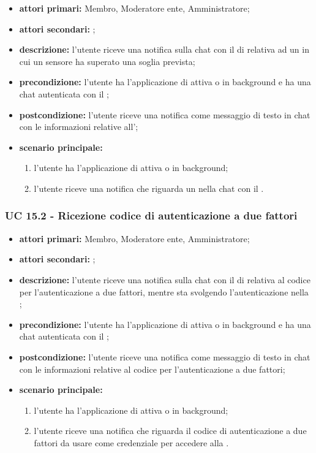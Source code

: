 	\begin{itemize}
		\item \textbf{attori primari:} Membro, Moderatore ente, Amministratore;
		\item \textbf{attori secondari:} ;
		\item \textbf{descrizione:} l'utente riceve una notifica sulla chat con il  di  relativa ad un  in cui un sensore ha superato una soglia prevista;
		\item \textbf{precondizione:} l'utente ha l'applicazione di  attiva o in background e ha una chat autenticata con il ;
		\item \textbf{postcondizione:} l'utente riceve una notifica come messaggio di testo in chat con le informazioni relative all';
		\item \textbf{scenario principale:}
		\begin{enumerate}
			\item l'utente ha l'applicazione di  attiva o in background;
			\item l'utente riceve una notifica che riguarda un  nella chat con il .
		\end{enumerate}
	\end{itemize}

	\subsubsection{UC 15.2 - Ricezione codice di autenticazione a due fattori}

	\begin{itemize}
		\item \textbf{attori primari:} Membro, Moderatore ente, Amministratore;
		\item \textbf{attori secondari:} ;
		\item \textbf{descrizione:} l'utente riceve una notifica sulla chat con il  di  relativa al codice per l'autenticazione a due fattori, mentre sta svolgendo l'autenticazione nella ;
		\item \textbf{precondizione:} l'utente ha l'applicazione di  attiva o in background e ha una chat autenticata con il ;
		\item \textbf{postcondizione:} l'utente riceve una notifica come messaggio di testo in chat con le informazioni relative al codice per l'autenticazione a due fattori;
		\item \textbf{scenario principale:}
		\begin{enumerate}
			\item l'utente ha l'applicazione di  attiva o in background;
			\item l'utente riceve una notifica che riguarda il codice di autenticazione a due fattori da usare come credenziale per accedere alla .
		\end{enumerate}
	\end{itemize}